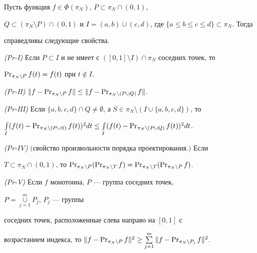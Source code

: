 \begin{lem}


\label{nbr}


Пусть функция $f\in\Phi(\pi_N)$, $P\subset \pi_N\cap(0,1)$,


$Q\subset (\pi_N\setminus P)\cap(0,1)$ и $I=(a,b)\cup


(c,d)$, где $\{a\leq b\leq c\leq d\}\subset \pi_N$. Тогда


справедливы следующие свойства.





{\em (Pr-I)} Если $P\subset I$ и не имеет с $([0,1]\setminus


I)\cap\pi_N$ соседних точек, то 


$\operatorname{Pr}_{\pi_N\setminus P}f(t)=f(t)$ при $t\notin I$.





{\em (Pr-II)} $\|f-\PR_{\pi_N\setminus P}f\|\leq \|f-\PR_{\pi_N\setminus


(P\cup Q)}f\|$.





{\em (Pr-III)} Если $ \{a,b,c,d\}\cap Q\neq


\emptyset$, а $S\in \pi_N \setminus(I \cup \{a,b,c,d\})$, то


$\int\limits_I(f(t)-\PR_{\pi_N\setminus (P\cup S)}f(t))^2dt\leq


\int\limits_I(f(t)-\PR_{\pi_N\setminus(P\cup Q)}f(t))^2dt$.





{\em (Pr-IV)} $($свойство произвольности порядка проектирования.$)$ Если


$T\subset \pi_N\cap(0,1)$, то $\PR_{\pi_N\setminus P}


(\PR_{\pi_N\setminus T} f)=\PR_{\pi_N\setminus T}(\PR_{\pi_N\setminus P} f)$.





{\em (Pr-V)} Если $f$ монотонна, $P$ --- группа соседних точек,


$P=\mathop{\cup}\limits_{j=1}^m P_j$, $P_j$ --- группы


соседних точек, расположенные слева направо на $[0,1]$ с


возрастанием индекса, то $\|f-\PR_{\pi_N\setminus P}f\|^2\geq


\sum\limits_{j=1}^m \|f-\PR_{\pi_N\setminus P_j}f\|^2$.


\end{lem}



